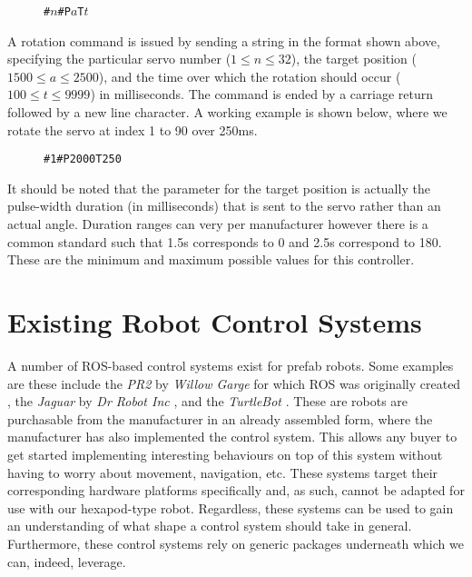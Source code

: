 \begin{figure}[!h]
    \centering
    \texttt{\#\(n\)\#P\(a\)T\(t\)}
\end{figure}

A rotation command is issued by sending a string in the format shown above, specifying the particular servo number ($1 \leq n \leq 32$), the target position ($1500 \leq a \leq 2500$), and the time over which the rotation should occur ($100 \leq t \leq 9999$) in milliseconds. The command is ended by a carriage return followed by a new line character. A working example is shown below, where we rotate the servo at index 1 to 90\textdegree{} over 250ms.

\begin{figure}[!h]
    \centering
    \texttt{\#1\#P2000T250}
\end{figure}

It should be noted that the parameter for the target position is actually the pulse-width duration (in milliseconds) that is sent to the servo rather than an actual angle. Duration ranges can very per manufacturer however there is a common standard such that 1.5\textmu s corresponds to 0\textdegree{} and 2.5\textmu s correspond to 180\textdegree. These are the minimum and maximum possible values for this controller. 


\section{Existing Robot Control Systems}

A number of ROS-based control systems exist for prefab robots. Some examples are these include the \emph{PR2} by \emph{Willow Garge} for which ROS was originally created \cite{ros_pr2}, the \emph{Jaguar} by \emph{Dr Robot Inc} \cite{jag}, and the \emph{TurtleBot} \cite{turtlebot}. These are robots are purchasable from the manufacturer in an already assembled form, where the manufacturer has also implemented the control system. This allows any buyer to get started implementing interesting behaviours on top of this system without having to worry about movement, navigation, etc. These systems target their corresponding hardware platforms specifically and, as such, cannot be adapted for use with our hexapod-type robot. Regardless, these systems can be used to gain an understanding of what shape a control system should take in general. Furthermore, these control systems rely on generic packages underneath which we can, indeed, leverage.

